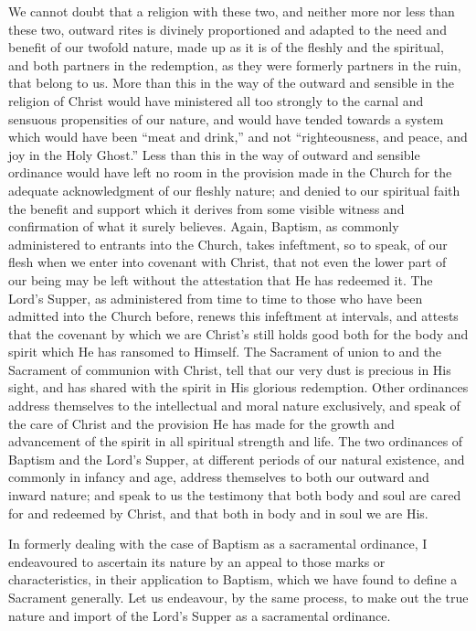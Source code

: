 \documentclass[]{book}
\begin{document}
We cannot doubt that a religion with these two, and neither more nor less than these two, outward rites is divinely proportioned and adapted to the need and benefit of our twofold nature, made up as it is of the fleshly and the spiritual, and both partners in the redemption, as they were formerly partners in the ruin, that belong to us. More than this in the way of the outward and sensible in the religion of Christ would have ministered all too strongly to the carnal and sensuous propensities of our nature, and would have tended towards a system which would have been ``meat and drink,'' and not ``righteousness, and peace, and joy in the Holy Ghost.'' Less than this in the way of outward and sensible ordinance would have left no room in the provision made in the Church for the adequate acknowledgment of our fleshly nature; and denied to our spiritual faith the benefit and support which it derives from some visible witness and confirmation of what it surely believes. Again, Baptism, as commonly administered to entrants into the Church, takes infeftment, so to speak, of our flesh when we enter into covenant with Christ, that not even the lower part of our being may be left without the attestation that He has redeemed it. The Lord's Supper, as administered from time to time to those who have been admitted into the Church before, renews this infeftment at intervals, and attests that the covenant by which we are Christ's still holds good both for the body and spirit which He has ransomed to Himself. The Sacrament of union to and the Sacrament of communion with Christ, tell that our very dust is precious in His sight, and has shared with the spirit in His glorious redemption. Other ordinances address themselves to the intellectual and moral nature exclusively, and speak of the care of Christ and the provision He has made for the growth and advancement of the spirit in all spiritual strength and life. The two ordinances of Baptism and the Lord's Supper, at different periods of our natural existence, and commonly in infancy and age, address themselves to both our outward and inward nature; and speak to us the testimony that both body and soul are cared for and redeemed by Christ, and that both in body and in soul we are His.

In formerly dealing with the case of Baptism as a sacramental ordinance, I endeavoured to ascertain its nature by an appeal to those marks or characteristics, in their application to Baptism, which we have found to define a Sacrament generally. Let us endeavour, by the same process, to make out the true nature and import of the Lord's Supper as a sacramental ordinance.
\end{document}

